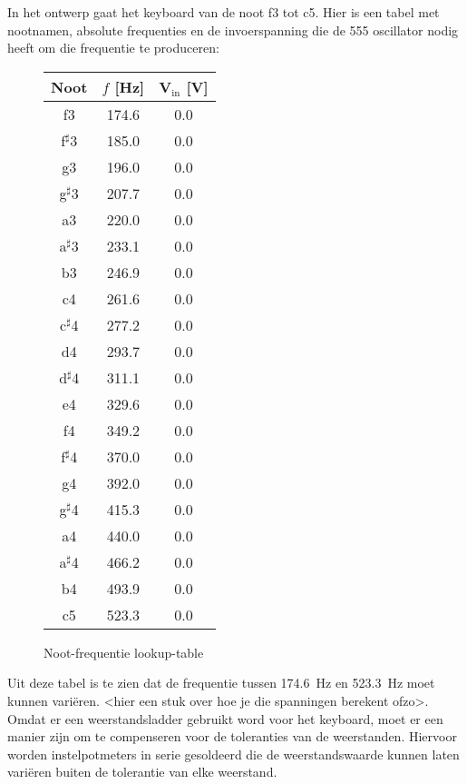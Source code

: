 \documentclass[12pt, a4paper, dutch]{article}
\newcommand{\s}{$^{\sharp}$}
\newcommand{\sub}[1]{$_{\text{#1}}$}
\begin{document}
In het ontwerp gaat het keyboard van de noot f3 tot c5. Hier is een tabel met
nootnamen, absolute frequenties en de invoerspanning die de 555 oscillator nodig
heeft om die frequentie te produceren:

\begin{figure}[H]
\centering
\begin{tabular}{ccc}
\toprule
Noot & $f$ [\si{\hertz}] & V\sub{in} [\si{\volt}]\\
\midrule
f3   & \num{174.6} & \num{0.0} \\
f\s3 & \num{185.0} & \num{0.0} \\
g3   & \num{196.0} & \num{0.0} \\
g\s3 & \num{207.7} & \num{0.0} \\
a3   & \num{220.0} & \num{0.0} \\
a\s3 & \num{233.1} & \num{0.0} \\
b3   & \num{246.9} & \num{0.0} \\
c4   & \num{261.6} & \num{0.0} \\
c\s4 & \num{277.2} & \num{0.0} \\
d4   & \num{293.7} & \num{0.0} \\
d\s4 & \num{311.1} & \num{0.0} \\
e4   & \num{329.6} & \num{0.0} \\
f4   & \num{349.2} & \num{0.0} \\
f\s4 & \num{370.0} & \num{0.0} \\
g4   & \num{392.0} & \num{0.0} \\
g\s4 & \num{415.3} & \num{0.0} \\
a4   & \num{440.0} & \num{0.0} \\
a\s4 & \num{466.2} & \num{0.0} \\
b4   & \num{493.9} & \num{0.0} \\
c5   & \num{523.3} & \num{0.0} \\
\bottomrule
\end{tabular}
\caption{Noot-frequentie lookup-table}
\end{figure}

Uit deze tabel is te zien dat de frequentie tussen \SI{174.6}{\hertz} en
\SI{523.3}{\hertz} moet kunnen vari\"eren. <hier een stuk over hoe je die spanningen
berekent ofzo>. Omdat er een weerstandsladder gebruikt word voor het keyboard, moet
er een manier zijn om te compenseren voor de toleranties van de weerstanden. Hiervoor
worden instelpotmeters in serie gesoldeerd die de weerstandswaarde kunnen laten
vari\"eren buiten de tolerantie van elke weerstand.
\end{document}
